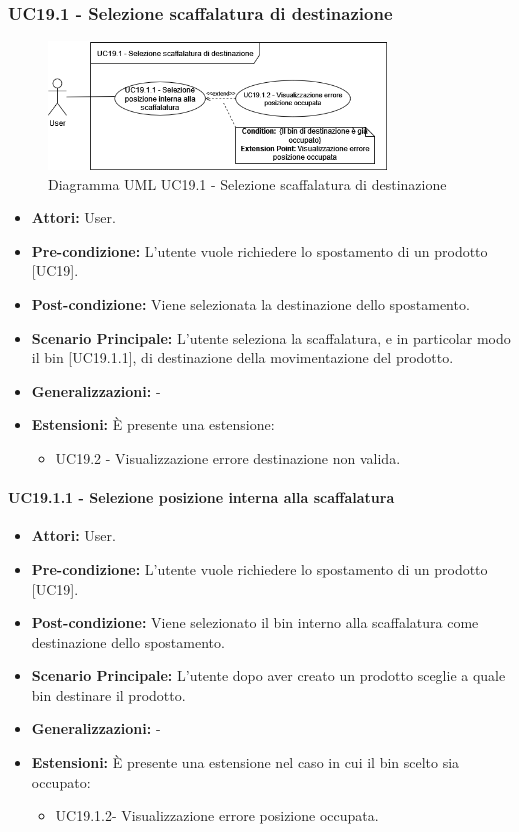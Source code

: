 \subsubsection{UC19.1 - Selezione scaffalatura di destinazione}
\begin{figure}[H]
  \centering
  \includegraphics[width=0.8\textwidth]{UC_diagrams_11-20/UC19.1.drawio.png}
   \caption{Diagramma UML UC19.1 - Selezione scaffalatura di destinazione}
\end{figure}
\begin{itemize}
    \item \textbf{Attori:} User.
    \item \textbf{Pre-condizione:} L'utente vuole richiedere lo spostamento di un prodotto [UC19].
    \item \textbf{Post-condizione:} Viene selezionata la destinazione dello spostamento.
    \item \textbf{Scenario Principale:} L'utente seleziona la scaffalatura, e in particolar modo il bin [UC19.1.1], di destinazione della movimentazione del prodotto.
    \item \textbf{Generalizzazioni:} -
    \item \textbf{Estensioni:} È presente una estensione:
    \begin{itemize}
        \item UC19.2 - Visualizzazione errore destinazione non valida.
    \end{itemize}
\end{itemize}


\paragraph{UC19.1.1 - Selezione posizione interna alla scaffalatura}
\begin{itemize}
    \item \textbf{Attori:} User.
    \item \textbf{Pre-condizione:}  L'utente vuole richiedere lo spostamento di un prodotto [UC19].
    \item \textbf{Post-condizione:} Viene selezionato il bin interno alla scaffalatura come destinazione dello spostamento.
    \item \textbf{Scenario Principale:} L'utente dopo aver creato un prodotto sceglie a quale bin destinare il prodotto.
    \item \textbf{Generalizzazioni:} -
    \item \textbf{Estensioni:} È presente una estensione nel caso in cui il bin scelto sia occupato:
    \begin{itemize}
        \item UC19.1.2- Visualizzazione errore posizione occupata.
    \end{itemize}
\end{itemize}


